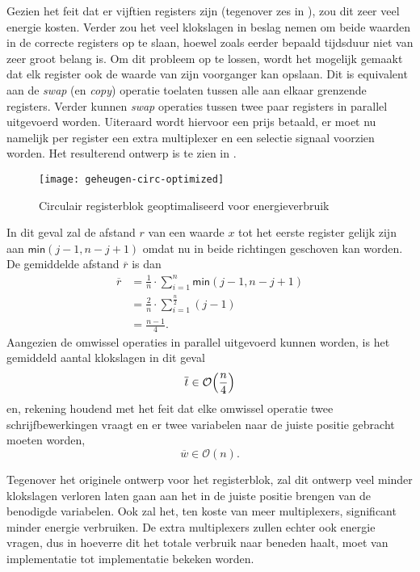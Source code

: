 Gezien het feit dat er vijftien registers zijn (tegenover zes in \cite{lee}), zou dit zeer veel energie kosten. Verder zou het veel klokslagen in beslag nemen om beide waarden in de correcte registers op te slaan, hoewel zoals eerder bepaald tijdsduur niet van zeer groot belang is. Om dit probleem op te lossen, wordt het mogelijk gemaakt dat elk register ook de waarde van zijn voorganger kan opslaan. Dit is equivalent aan de \emph{swap} (en \emph{copy}) operatie toelaten tussen alle aan elkaar grenzende registers. Verder kunnen \emph{swap} operaties tussen twee paar registers in parallel uitgevoerd worden. Uiteraard wordt hiervoor een prijs betaald, er moet nu namelijk per register een extra multiplexer en een selectie signaal voorzien worden.  Het resulterend ontwerp is te zien in .

\begin{figure}[h]
	\centering
		\texttt{[image: geheugen-circ-optimized]}
		\caption{Circulair registerblok geoptimaliseerd voor energieverbruik\label{figuur-implementatie-miller-geheugen-circ-optimized}}
\end{figure}

In dit geval zal de afstand $r$ van een waarde $x$ tot het eerste register gelijk zijn aan $\textsf{min}(j - 1, n - j + 1)$ omdat nu in beide richtingen geschoven kan worden. De gemiddelde afstand $\overline{r}$ is dan
\[\begin{aligned}
\overline{r}	&= \frac{1}{n} \cdot \sum_{i = 1}^{n} \textsf{min}(j - 1, n - j + 1)\\
	&= \frac{2}{n} \cdot \sum_{i = 1}^{\frac{n}{2}} (j - 1)\\
	&= \frac{n - 1}{4}.
\end{aligned}\]
Aangezien de omwissel operaties in parallel uitgevoerd kunnen worden, is het gemiddeld aantal klokslagen in dit geval
\[\overline{t} \in \mathcal{O}  \Bigl( \frac{n}{4} \Bigr)\]
en, rekening houdend met het feit dat elke omwissel operatie twee schrijfbewerkingen vraagt en er twee variabelen naar de juiste positie gebracht moeten worden,
\[\overline{w} \in \mathcal{O}(n).\]

Tegenover het originele ontwerp voor het registerblok, zal dit ontwerp veel minder klokslagen verloren laten gaan aan het in de juiste positie brengen van de benodigde variabelen. Ook zal het, ten koste van meer multiplexers, significant minder energie verbruiken. De extra multiplexers zullen echter ook energie vragen, dus in hoeverre dit het totale verbruik naar beneden haalt, moet van implementatie tot implementatie bekeken worden. 

